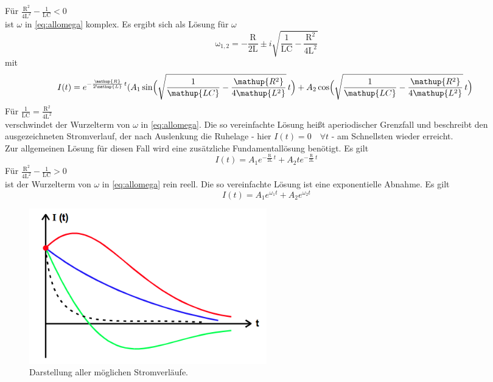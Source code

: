 Für $\frac{\mathup{R^2}}{4\mathup{L^2}}-\frac{1}{\mathup{LC}}<0$ \\
ist $\omega$ in \eqref{eq:allomega} komplex.
Es ergibt sich als Lösung für $\omega$
\begin{equation}
	\mathup{\omega_{1,2}}= -\frac{\mathup{R}}{2\mathup{L}}\pm i\sqrt{\frac{1}{\mathup{LC}}-\frac{\mathup{R^2}}{4\mathup{L^2}}}
\end{equation}
mit
\begin{equation}
	I(t) = e^{-\frac{\mathup{R}}{2\mathup{L}}\,t}(A_1 \sin\Bigl(\sqrt{\frac{1}{\mathup{LC}}-\frac{\mathup{R^2}}{4\mathup{L^2}}}\, t\Bigr)+A_2 \cos\Bigl(\sqrt{\frac{1}{\mathup{LC}}-\frac{\mathup{R^2}}{4\mathup{L^2}}}\,t\Bigr)\
	\label{eq:schwingloesung}
\end{equation}
Für $\frac{1}{\mathup{LC}}=\frac{\mathup{R^2}}{4\mathup{L^2}}$ \\
verschwindet der Wurzelterm von $\omega$ in \eqref{eq:allomega}.
Die so vereinfachte Lösung heißt aperiodischer Grenzfall und beschreibt den ausgezeichneten Stromverlauf, der nach Auslenkung die Ruhelage - hier $I(t)=0 \quad\forall t$ - am Schnellsten wieder erreicht.\\
Zur allgemeinen Lösung für diesen Fall wird eine zusätzliche Fundamentallösung benötigt.
Es gilt
\begin{equation}
	I(t) = A_1 e^{-\frac{\mathup{R}}{2\mathup{L}}\,t}+A_2 t e^{-\frac{\mathup{R}}{2\mathup{L}}\,t}
\end{equation}
Für $\frac{\mathup{R^2}}{4\mathup{L^2}}-\frac{1}{\mathup{LC}}>0$ \\
ist der Wurzelterm von $\omega$ in \eqref{eq:allomega} rein reell.
Die so vereinfachte Lösung ist eine exponentielle Abnahme.
Es gilt
\begin{equation}
	I(t)= A_1 e^{\omega_1 t} + A_2 e^{\omega_2 t}
\end{equation}
\begin{figure}
	\centering
	\includegraphics[width=0.5\textwidth]{Bilder/Loesungsform.png}
	\caption{Darstellung aller möglichen Stromverläufe. \cite{v354}}
\end{figure}

